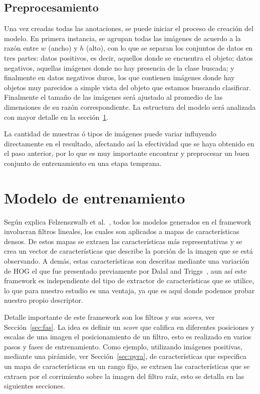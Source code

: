 \subsection{Preprocesamiento}\label{subsec:pre}
Una vez creadas todas las anotaciones, se puede iniciar el proceso de creación del modelo. En primera instancia, se agrupan todas las imágenes de acuerdo a la razón entre $w$ (ancho) y $h$ (alto), con lo que se separan los conjuntos de datos en tres partes: datos positivos, es decir, aquellos donde se encuentra el objeto; datos negativos, aquellas imágenes donde no hay presencia de la clase buscada; y finalmente en datos negativos duros, los que contienen imágenes donde hay objetos muy parecidos a simple vista del objeto que estamos buscando clasificar. Finalmente el tamaño de las imágenes será ajustado al promedio de las dimensiones de su razón correspondiente. La estructura del modelo será analizada con mayor detalle en la sección~\ref{sec:model}.

La cantidad de muestras ó tipos de imágenes puede variar influyendo directamente en el resultado, afectando así la efectividad que se haya obtenido en el paso anterior, por lo que es muy importante encontrar y preprocesar un buen conjunto de entrenamiento en una etapa temprana.

\section{Modelo de entrenamiento}\label{sec:model}
Según explica Felzenszwalb et al.~\cite{Felzenszwalb2010}, todos los modelos generados en el framework involucran filtros lineales, los cuales son aplicados a mapas de características densos. De estos mapas se extraen las características más representativas y se crea un vector de características que describe la porción de la imagen que se está observando. A demás, estas características son descritas mediante una variación de HOG el que fue presentado previamente por Dalal and Triggs~\cite{Dalal2005}, aun así este framework es independiente del tipo de extractor de características que se utilice, lo que para nuestro estudio es una ventaja, ya que es aquí donde podemos probar nuestro propio descriptor.

Detalle importante de este framework son los filtros y sus \textit{scores}, ver Sección~\ref{sec:fas}. La idea es definir un \textit{score} que califica en diferentes posiciones y escalas de una imagen el posicionamiento de un filtro, esto es realizado en varios pasos y fases de entrenamiento. Como ejemplo, utilizando imágenes positivas, mediante una pirámide, ver Sección~\ref{sec:pyra}, de características que especifica un mapa de características en un rango fijo, se extraen las características que se extraen por el corrimiento sobre la imagen del filtro raíz, esto se detalla en las siguientes secciones. 


